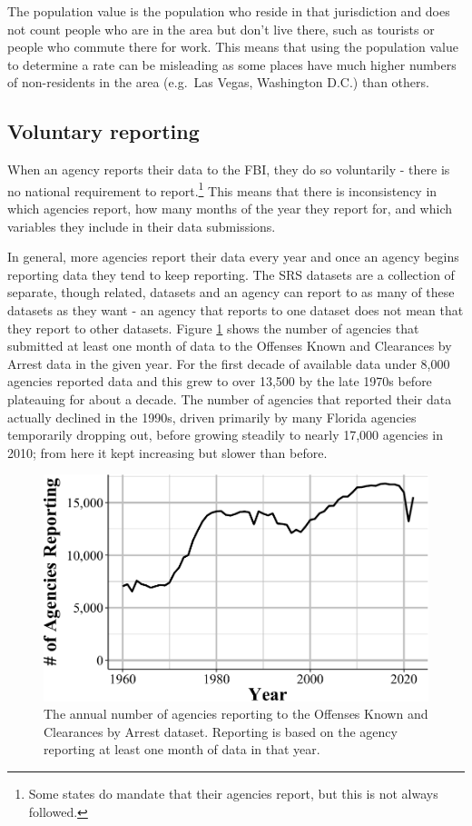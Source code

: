 \documentclass[
  12pt,
  openany]{book}
\begin{document}
The population value is the population who reside in that jurisdiction and does not count people who are in the area but don't live there, such as tourists or people who commute there for work. This means that using the population value to determine a rate can be misleading as some places have much higher numbers of non-residents in the area (e.g.~Las Vegas, Washington D.C.) than others.

\subsection{Voluntary reporting}\label{voluntary}

When an agency reports their data to the FBI, they do so voluntarily - there is no national requirement to report.\footnote{Some states do mandate that their agencies report, but this is not always followed.} This means that there is inconsistency in which agencies report, how many months of the year they report for, and which variables they include in their data submissions.

In general, more agencies report their data every year and once an agency begins reporting data they tend to keep reporting. The SRS datasets are a collection of separate, though related, datasets and an agency can report to as many of these datasets as they want - an agency that reports to one dataset does not mean that they report to other datasets. Figure \ref{fig:SRSagenciesReporting} shows the number of agencies that submitted at least one month of data to the Offenses Known and Clearances by Arrest data in the given year. For the first decade of available data under 8,000 agencies reported data and this grew to over 13,500 by the late 1970s before plateauing for about a decade. The number of agencies that reported their data actually declined in the 1990s, driven primarily by many Florida agencies temporarily dropping out, before growing steadily to nearly 17,000 agencies in 2010; from here it kept increasing but slower than before.

\begin{figure}

{\centering \includegraphics[width=0.9\linewidth]{index_files/figure-latex/SRSagenciesReporting-1} 

}

\caption{The annual number of agencies reporting to the Offenses Known and Clearances by Arrest dataset. Reporting is based on the agency reporting at least one month of data in that year.}\label{fig:SRSagenciesReporting}
\end{figure}
\end{document}
